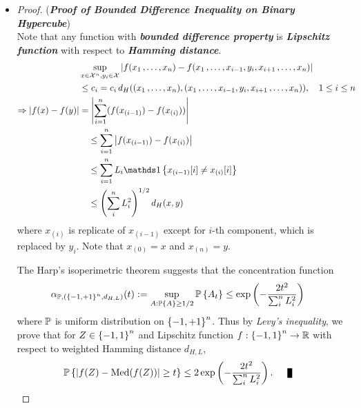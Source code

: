 \documentclass[11pt]{article}
\begin{document}
\begin{itemize}
\item \begin{proof} (\textbf{\emph{Proof of Bounded Difference Inequality on Binary Hypercube}}) \\
Note that any  function with \emph{\textbf{bounded difference property}} is \emph{\textbf{Lipschitz function}} with respect to \emph{\textbf{Hamming distance}}. 
\begin{align*}
&\sup_{x \in \cX^n, y_i \in \cX}\abs{f(x_1 \xdotx{,} x_n) - f(x_1 \xdotx{,} x_{i-1}, y_i, x_{i+1} \xdotx{,} x_{n})} &\\
&\le c_i = c_i\,d_{H}((x_1 \xdotx{,} x_n), (x_1 \xdotx{,} x_{i-1}, y_i, x_{i+1} \xdotx{,} x_{n})), \quad 1\le i \le n\\
\Rightarrow \abs{f(x) - f(y)} &=  \abs{\sum_{i=1}^{n}(f(x_{(i-1)}) - f(x_{(i)}) )}\\
&\quad \le  \sum_{i=1}^{n}\abs{f(x_{(i-1)}) - f(x_{(i)}) }\\
&\quad \le \sum_{i=1}^{n}L_i \ind{x_{(i-1)}[i] \neq x_{(i)}[i]} \\
&\quad \le \paren{\sum_i^{n}L_i^2}^{1/2} d_{H}(x, y)
\end{align*}   where $x_{(i)}$ is replicate of $x_{(i-1)}$ except for $i$-th component, which is replaced by $y_i$. Note that $x_{(0)} = x$ and $x_{(n)} = y$. 

The Harp's isoperimetric theorem suggests that the concentration function 
\begin{align*}
\alpha_{{\mathbb P}, (\left\{-1, +1\right\}^n, d_{H, L})}(t) := \sup_{A: {\mathbb P}\left\{A\right\} \ge 1/2}{\mathbb P}\left\{A_t\right\} &\le \exp\left(- \frac{2t^2}{\sum_i^{n}L_i^2}\right)
\end{align*} where ${\mathbb P}$ is uniform distribution on $\left\{-1, +1\right\}^n$. Thus by \emph{Levy's inequality}, we prove that for $Z \in \left\{-1, 1\right\}^n$ and Lipschitz function $f: \left\{-1, 1\right\}^n \to {\mathbb R}$ with respect to weighted Hamming distance $d_{H, L}$, 
\begin{align*}
\bP\set{\abs{f(Z) - \text{Med}(f(Z))} \ge t} &\le 2 \exp\paren{- \frac{2t^2}{\sum_i^{n}L_i^2}}. \qed
\end{align*} 
\end{proof}
\end{itemize}
\end{document}
